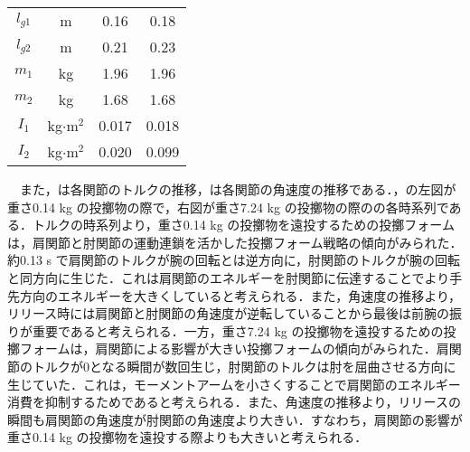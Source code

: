 \begin{small}
\begin{table}[tb]
\begin{center}
{\begin{tabular}{c|c|c|c}
      $l_{g1}$ & m & 0.16 & 0.18 \\
      $l_{g2}$ & m & 0.21 & 0.23 \\
      $m_{1}$ & kg & 1.96 & 1.96\\
      $m_{2}$ & kg & 1.68 & 1.68\\
      $I_{1}$ & kg$\cdot$$\mathrm{m}^2$ & 0.017 & 0.018 \\
      $I_{2}$ & kg$\cdot$$\mathrm{m}^2$ & 0.020 & 0.099 \\
      \hline
    \end{tabular}
    }
  \end{center}
\end{table}
　また，は各関節のトルクの推移，は各関節の角速度の推移である．，の左図が重さ0.14 kg の投擲物の際で，右図が重さ7.24 kg の投擲物の際のの各時系列である．トルクの時系列より，重さ0.14 kg の投擲物を遠投するための投擲フォームは，肩関節と肘関節の運動連鎖を活かした投擲フォーム戦略の傾向がみられた．約0.13 s で肩関節のトルクが腕の回転とは逆方向に，肘関節のトルクが腕の回転と同方向に生じた．これは肩関節のエネルギーを肘関節に伝達することでより手先方向のエネルギーを大きくしていると考えられる．また，角速度の推移より，リリース時には肩関節と肘関節の角速度が逆転していることから最後は前腕の振りが重要であると考えられる．一方，重さ7.24 kg の投擲物を遠投するための投擲フォームは，肩関節による影響が大きい投擲フォームの傾向がみられた．肩関節のトルクが0となる瞬間が数回生じ，肘関節のトルクは肘を屈曲させる方向に生じていた．これは，モーメントアームを小さくすることで肩関節のエネルギー消費を抑制するためであると考えられる．また、角速度の推移より，リリースの瞬間も肩関節の角速度が肘関節の角速度より大きい．すなわち，肩関節の影響が重さ0.14 kg の投擲物を遠投する際よりも大きいと考えられる．

\end{small}
